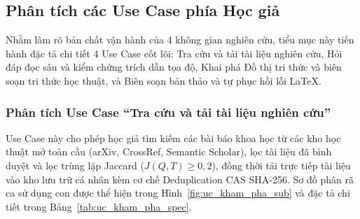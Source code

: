 \subsection{Phân tích các Use Case phía Học giả}
\label{subsec:uc_scholar}

Nhằm làm rõ bản chất vận hành của 4 không gian nghiên cứu, tiểu mục này tiến hành đặc tả chi tiết 4 Use Case cốt lõi: Tra cứu và tải tài liệu nghiên cứu, Hỏi đáp đọc sâu và kiểm chứng trích dẫn tọa độ, Khai phá Đồ thị tri thức và biên soạn tri thức học thuật, và Biên soạn bản thảo và tự phục hồi lỗi LaTeX.

\subsubsection{Phân tích Use Case ``Tra cứu và tải tài liệu nghiên cứu''}
\label{subsubsec:uc_kham_pha}

Use Case này cho phép học giả tìm kiếm các bài báo khoa học từ các kho học thuật mở toàn cầu (arXiv, CrossRef, Semantic Scholar), lọc tài liệu đã bình duyệt và lọc trùng lặp Jaccard ($J(Q, T) \ge 0{,}2$), đồng thời tải trực tiếp tài liệu vào kho lưu trữ cá nhân kèm cơ chế Deduplication CAS SHA-256. Sơ đồ phân rã ca sử dụng con được thể hiện trong Hình~\ref{fig:uc_kham_pha_sub} và đặc tả chi tiết trong Bảng~\ref{tab:uc_kham_pha_spec}.

